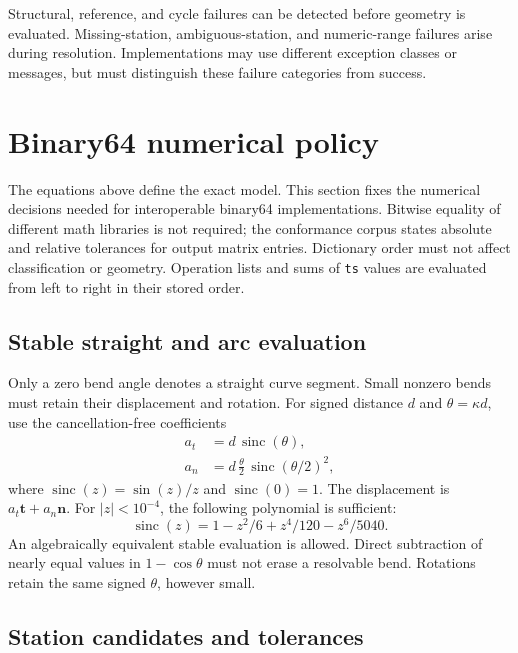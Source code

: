 \documentclass[11pt,a4paper]{article}
\begin{document}
Structural, reference, and cycle failures can be detected before geometry is
evaluated. Missing-station, ambiguous-station, and numeric-range failures arise
during resolution. Implementations may use different exception classes or
messages, but must distinguish these failure categories from success.

\section{Binary64 numerical policy}
\label{sec:numerics}

The equations above define the exact model. This section fixes the numerical
decisions needed for interoperable binary64 implementations. Bitwise equality
of different math libraries is not required; the conformance corpus states
absolute and relative tolerances for output matrix entries. Dictionary order
must not affect classification or geometry. Operation lists and sums of
\texttt{ts} values are evaluated from left to right in their stored order.

\subsection{Stable straight and arc evaluation}

Only a zero bend angle denotes a straight curve segment. Small nonzero bends
must retain their displacement and rotation. For signed distance $d$ and
$\theta=\kappa d$, use the cancellation-free coefficients
\begin{align}
 a_t &= d\,\operatorname{sinc}(\theta),\\
 a_n &= d\,\frac{\theta}{2}\,
                 \operatorname{sinc}(\theta/2)^2,
\end{align}
where $\operatorname{sinc}(z)=\sin(z)/z$ and
$\operatorname{sinc}(0)=1$. The displacement is $a_t\mathbf{t}+a_n\mathbf{n}$.
For $|z|<10^{-4}$, the following polynomial is sufficient:
\begin{equation}
 \operatorname{sinc}(z)=1-z^2/6+z^4/120-z^6/5040.
\end{equation}
An algebraically equivalent stable evaluation is allowed. Direct subtraction
of nearly equal values in $1-\cos\theta$ must not erase a resolvable bend.
Rotations retain the same signed $\theta$, however small.

\subsection{Station candidates and tolerances}
\end{document}
